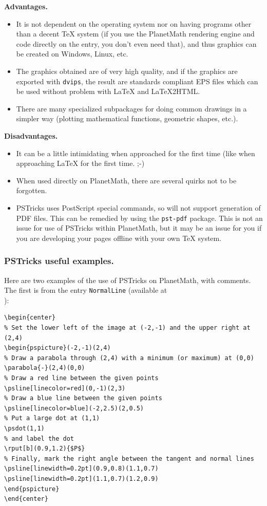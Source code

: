\textbf{Advantages.}
\begin{itemize}
\item It is not dependent on the operating system nor on having programs other than a decent TeX system (if you use the PlanetMath rendering engine and code directly on the entry, you don't even need that), and thus graphics can be created on Windows, Linux, etc.
\item The graphics obtained are of very high quality, and if the graphics are exported with \texttt{dvips}, the result are standards compliant EPS files which can be used without problem with LaTeX and LaTeX2HTML.
\item There are many specialized subpackages for doing common drawings in a simpler way (plotting mathematical functions, geometric shapes, etc.).
\end{itemize}

\textbf{Disadvantages.}
\begin{itemize}
\item It can be a little intimidating when approached for the first time (like when approaching LaTeX for the first time. ;-)
\item When used directly on PlanetMath, there are several quirks not to be forgotten.
\item PSTricks uses PostScript special commands, so will not support generation of PDF files. This can be remedied by using the \texttt{pst-pdf} package. This is not an issue for use of PSTricks within PlanetMath, but it may be an issue for you if you are developing your pages offline with your own TeX system.
\end{itemize}

\subsubsection{PSTricks useful examples.}
Here are two examples of the use of PSTricks on PlanetMath, with comments. The first is from the entry \texttt{NormalLine} (available at \\ ):

\begin{Verbatim}
\begin{center}
% Set the lower left of the image at (-2,-1) and the upper right at (2,4)
\begin{pspicture}(-2,-1)(2,4)
% Draw a parabola through (2,4) with a minimum (or maximum) at (0,0)
\parabola{-}(2,4)(0,0)
% Draw a red line between the given points
\psline[linecolor=red](0,-1)(2,3)
% Draw a blue line between the given points
\psline[linecolor=blue](-2,2.5)(2,0.5)
% Put a large dot at (1,1)
\psdot(1,1)
% and label the dot
\rput[b](0.9,1.2){$P$}
% Finally, mark the right angle between the tangent and normal lines
\psline[linewidth=0.2pt](0.9,0.8)(1.1,0.7)
\psline[linewidth=0.2pt](1.1,0.7)(1.2,0.9)
\end{pspicture}
\end{center}
\end{Verbatim}

